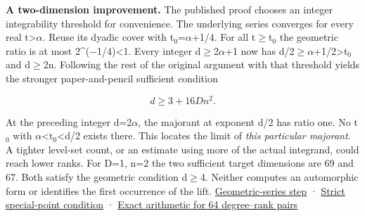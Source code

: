 \documentclass[11pt,letterpaper]{article}
\begin{document}
\textbf{A two-dimension improvement.} The published proof chooses an integer integrability threshold for convenience. The underlying series converges for every real t>\ensuremath{\alpha}. Reuse its dyadic cover with t\ensuremath{{}_{0}}=\ensuremath{\alpha}+1/4. For all t\ensuremath{\ge}t\ensuremath{{}_{0}} the geometric ratio is at most 2\textasciicircum{}(\ensuremath{-}1/4)<1. Every integer d\ensuremath{\ge}2\ensuremath{\alpha}+1 now has d/2\ensuremath{\ge}\ensuremath{\alpha}+1/2>t\ensuremath{{}_{0}} and d\ensuremath{\ge}2n. Following the rest of the original argument with that threshold yields the stronger paper-and-pencil sufficient condition

\[\boxed{d\geq 3+16Dn^2}.\]

At the preceding integer d=2\ensuremath{\alpha}, the majorant at exponent d/2 has ratio one. No t\ensuremath{{}_{0}} with \ensuremath{\alpha}<t\ensuremath{{}_{0}}<d/2 exists there. This locates the limit of \emph{this particular majorant}. A tighter level-set count, or an estimate using more of the actual integrand, could reach lower ranks. For D=1, n=2 the two sufficient target dimensions are 69 and 67. Both satisfy the geometric condition d\ensuremath{\ge}4. Neither computes an automorphic form or identifies the first occurrence of the lift. \href{https://github.com/nousentllc/riemann-hypothesis/blob/40e56bab026552e089d7afcfeff08d2defb9c005/src/Development/WeilBound/ThetaLifts/LatticeBasics/HgtCount.lean\#L52-L75}{Geometric-series step} · \href{https://github.com/nousentllc/riemann-hypothesis/blob/40e56bab026552e089d7afcfeff08d2defb9c005/src/Development/AutomorphicArithmetic/Foundations/GaloisRepresentations/ThetaParseval/ThetaKernels/GalTPDefs.lean\#L141-L151}{Strict special-point condition} · \href{https://github.com/nousentllc/riemann-hypothesis/blob/003f8090b9894fb955d0925ea1b7f7da64a823c3/research/uriel/experiments/stable-range-theta/rank_checks.json}{Exact arithmetic for 64 degree–rank pairs}
\end{document}
